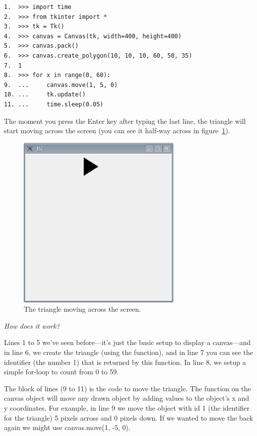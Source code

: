 \begin{listing}
\begin{verbatim}
1.  >>> import time
2.  >>> from tkinter import *
3.  >>> tk = Tk()
4.  >>> canvas = Canvas(tk, width=400, height=400)
5.  >>> canvas.pack()
6.  >>> canvas.create_polygon(10, 10, 10, 60, 50, 35)
7.  1
8.  >>> for x in range(0, 60):
9.  ...     canvas.move(1, 5, 0)
10. ...     tk.update()
11. ...     time.sleep(0.05)
\end{verbatim}
\end{listing}

The moment you press the Enter key after typing the last line, the triangle will start moving across the screen (you can see it half-way across in figure~\ref{fig44}).

\begin{figure}
\begin{center}
\includegraphics[width=80mm]{../en/figure44.eps}
\end{center}
\caption{The triangle moving across the screen.}\label{fig44}
\end{figure}

\par
\emph{How does it work?}
\par
Lines 1 to 5 we've seen before---it's just the basic setup to display a canvas---and in line 6, we create the triangle (using the  function), and in line 7 you can see the identifier (the number 1) that is returned by this function. In line 8, we setup a simple for-loop to count from 0 to 59.

The block of lines (9 to 11) is the code to move the triangle. The  function on the canvas object will move any drawn object by adding values to the object's x and y coordinates. For example, in line 9 we move the object with id 1 (the identifier for the triangle) 5 pixels across and 0 pixels down. If we wanted to move the back again we might use canvas.move(1, -5, 0).
 
